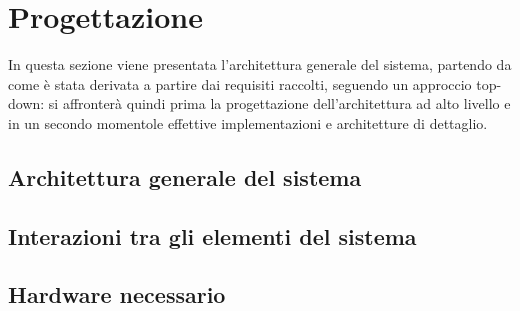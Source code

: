 \section{Progettazione}




In questa sezione viene presentata l'architettura generale del sistema, partendo da come è stata derivata a partire dai requisiti raccolti,
seguendo un approccio top-down: si affronterà quindi prima la progettazione dell'architettura ad alto livello
e in un secondo momentole effettive implementazioni e architetture di dettaglio.

\subsection{Architettura generale del sistema}

\subsection{Interazioni tra gli elementi del sistema}

\subsection{Hardware necessario}
